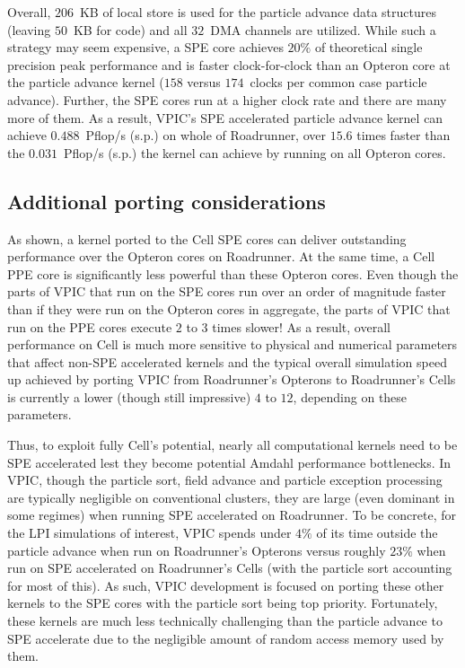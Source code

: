 \documentclass[journal,twoside]{IEEEtran}
\begin{document}
Overall, $206$~KB of local store is used for the particle advance data
structures (leaving $50$~KB for code) and all $32$~DMA channels are
utilized.  While such a strategy may seem expensive, a SPE core
achieves $20\%$ of theoretical single precision peak performance and
is faster clock-for-clock than an Opteron core at the particle advance
kernel ($158$ versus $174$~clocks per common case particle advance).
Further, the SPE cores run at a higher clock rate and there are many
more of them.  As a result, VPIC's SPE accelerated particle advance
kernel can achieve $0.488$~Pflop/s (s.p.) on whole of Roadrunner, over
$15.6$ times faster than the $0.031$~Pflop/s (s.p.) the kernel can
achieve by running on all Opteron cores.

\subsection{Additional porting considerations}

As shown, a kernel ported to the Cell SPE cores can deliver
outstanding performance over the Opteron cores on Roadrunner.  At the
same time, a Cell PPE core is significantly less powerful than these
Opteron cores.  Even though the parts of VPIC that run on the SPE
cores run over an order of magnitude faster than if they were run on
the Opteron cores in aggregate, the parts of VPIC that run on the PPE
cores execute $2$ to $3$ times slower!  As a result, overall
performance on Cell is much more sensitive to physical and numerical
parameters that affect non-SPE accelerated kernels and the typical
overall simulation speed up achieved by porting VPIC from Roadrunner's
Opterons to Roadrunner's Cells is currently a lower (though still
impressive) $4$ to $12$, depending on these parameters.

Thus, to exploit fully Cell's potential, nearly all computational
kernels need to be SPE accelerated lest they become potential Amdahl
performance bottlenecks.  In VPIC, though the particle sort, field
advance and particle exception processing are typically negligible on
conventional clusters, they are large (even dominant in some regimes)
when running SPE accelerated on Roadrunner.  To be concrete, for the
LPI simulations of interest, VPIC spends under $4\%$ of its time
outside the particle advance when run on Roadrunner's Opterons versus
roughly $23\%$ when run on SPE accelerated on Roadrunner's Cells (with
the particle sort accounting for most of this).  As such, VPIC
development is focused on porting these other kernels to the SPE cores
with the particle sort being top priority.  Fortunately, these kernels
are much less technically challenging than the particle advance to SPE
accelerate due to the negligible amount of random access memory used
by them.
\end{document}
